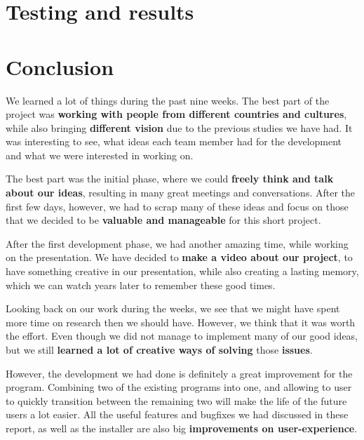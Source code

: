 \documentclass[a4paper, 11pt, article]{report}
\begin{document}

\chapter{Testing and results}


\chapter{Conclusion}

We learned a lot of things during the past nine weeks. The best part of the project was \textbf{working with people from different countries and cultures}, while also bringing \textbf{different vision} due to the previous studies we have had. It was interesting to see, what ideas each team member had for the development and what we were interested in working on.

The best part was the initial phase, where we could \textbf{freely think and talk about our ideas}, resulting in many great meetings and conversations. After the first few days, however, we had to scrap many of these ideas and focus on those that we decided to be \textbf{valuable and manageable} for this short project.

After the first development phase, we had another amazing time, while working on the presentation. We have decided to \textbf{make a video about our project}, to have something creative in our presentation, while also creating a lasting memory, which we can watch years later to remember these good times.

Looking back on our work during the weeks, we see that we might have spent more time on research then we should have. However, we think that it was worth the effort. Even though we did not manage to implement many of our good ideas, but we still \textbf{learned a lot of creative ways of solving} those \textbf{issues}.

However, the development we had done is definitely a great improvement for the program. Combining two of the existing programs into one, and allowing to user to quickly transition between the remaining two will make the life of the future users a lot easier. All the useful features and bugfixes we had discussed in these report, as well as the installer are also big \textbf{improvements on user-experience}.
\end{document}
